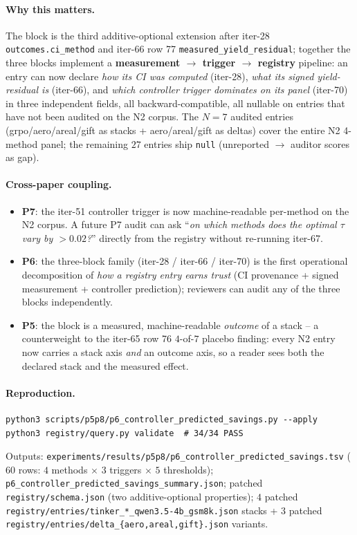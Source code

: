 \paragraph{Why this matters.}
The block is the third additive-optional extension after iter-28
\texttt{outcomes.ci\_method} and iter-66 row 77
\texttt{measured\_yield\_residual}; together the three blocks implement a
\textbf{measurement $\to$ trigger $\to$ registry} pipeline: an entry can now
declare \emph{how its CI was computed} (iter-28), \emph{what its signed
yield-residual is} (iter-66), and \emph{which controller trigger dominates on
its panel} (iter-70) in three independent fields, all backward-compatible,
all nullable on entries that have not been audited on the N2 corpus. The
$N{=}7$ audited entries (grpo/aero/areal/gift as stacks + aero/areal/gift as
deltas) cover the entire N2 4-method panel; the remaining $27$ entries ship
\texttt{null} (unreported $\to$ auditor scores as gap).

\paragraph{Cross-paper coupling.}
\begin{itemize}
  \item \textbf{P7}: the iter-51 controller trigger is now machine-readable
        per-method on the N2 corpus. A future P7 audit can ask
        ``\emph{on which methods does the optimal $\tau$ vary by $>0.02$?}''
        directly from the registry without re-running iter-67.
  \item \textbf{P6}: the three-block family (iter-28 / iter-66 / iter-70)
        is the first operational decomposition of \emph{how a registry
        entry earns trust} (CI provenance + signed measurement + controller
        prediction); reviewers can audit any of the three blocks
        independently.
  \item \textbf{P5}: the block is a measured, machine-readable
        \emph{outcome} of a stack -- a counterweight to the iter-65 row 76
        $4$-of-$7$ placebo finding: every N2 entry now carries a stack
        axis \emph{and} an outcome axis, so a reader sees both the declared
        stack and the measured effect.
\end{itemize}

\paragraph{Reproduction.}
\begin{verbatim}
python3 scripts/p5p8/p6_controller_predicted_savings.py --apply
python3 registry/query.py validate  # 34/34 PASS
\end{verbatim}
Outputs: \texttt{experiments/results/p5p8/p6\_controller\_predicted\_savings.tsv}
($60$ rows: $4$ methods $\times$ $3$ triggers $\times$ $5$ thresholds);
\texttt{p6\_controller\_predicted\_savings\_summary.json}; patched
\texttt{registry/schema.json} (two additive-optional properties); $4$ patched
\texttt{registry/entries/tinker\_*\_qwen3.5-4b\_gsm8k.json} stacks + $3$
patched \texttt{registry/entries/delta\_\{aero,areal,gift\}.json} variants.
